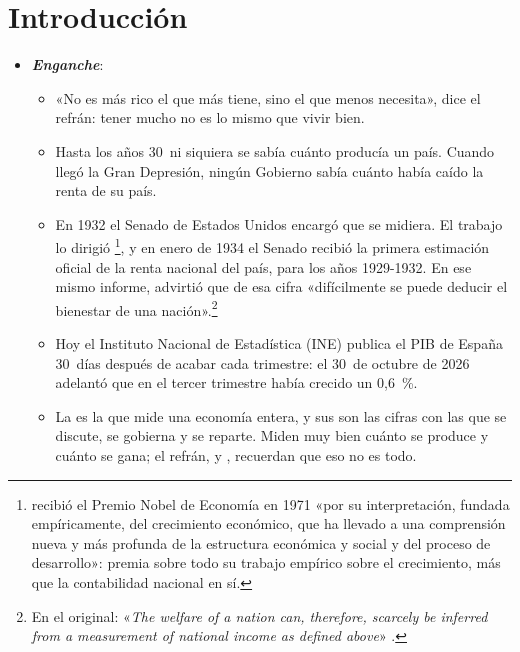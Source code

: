 \documentclass[11pt]{article}
\begin{document}
\tceetitulo

\section*{Introducción}

\begin{itemize}
\item \textbf{\emph{Enganche}}:
  \begin{itemize}
  \item «No es más rico el que más tiene, sino el que menos necesita», dice el refrán: tener mucho no es lo mismo que vivir bien.
  \item Hasta los años 30~ni siquiera se sabía cuánto producía un país. Cuando llegó la Gran Depresión, ningún Gobierno sabía cuánto había caído la renta de su país.
  \item En 1932 el Senado de Estados Unidos encargó que se midiera. El trabajo lo dirigió \footnote{ recibió el Premio Nobel de Economía en 1971 «por su interpretación, fundada empíricamente, del crecimiento económico, que ha llevado a una comprensión nueva y más profunda de la estructura económica y social y del proceso de desarrollo»\nocite{Nobel1971Kuznets}: premia sobre todo su trabajo empírico sobre el crecimiento, más que la contabilidad nacional en sí.}, y en enero de 1934 el Senado recibió la primera estimación oficial de la renta nacional del país, para los años 1929-1932\nocite{Kuznets1934NationalIncome,BEA2020Cuentas1930}. En ese mismo informe,  advirtió que de esa cifra «difícilmente se puede deducir el bienestar de una nación».\footnote{En el original: «\emph{The welfare of a nation can, therefore, scarcely be inferred from a measurement of national income as defined above}» \parencite[7]{Kuznets1934NationalIncome}.}
  \item Hoy el Instituto Nacional de Estadística (INE) publica el PIB de España 30~días después de acabar cada trimestre: el 30~de octubre de 2026 adelantó que en el tercer trimestre había crecido un 0,6~\%\nocite{INE2026avCNTR3T26}.
  \item La  es la que mide una economía entera, y sus  son las cifras con las que se discute, se gobierna y se reparte. Miden muy bien cuánto se produce y cuánto se gana; el refrán, y , recuerdan que eso no es todo.
  \end{itemize}


\end{itemize}
\end{document}

